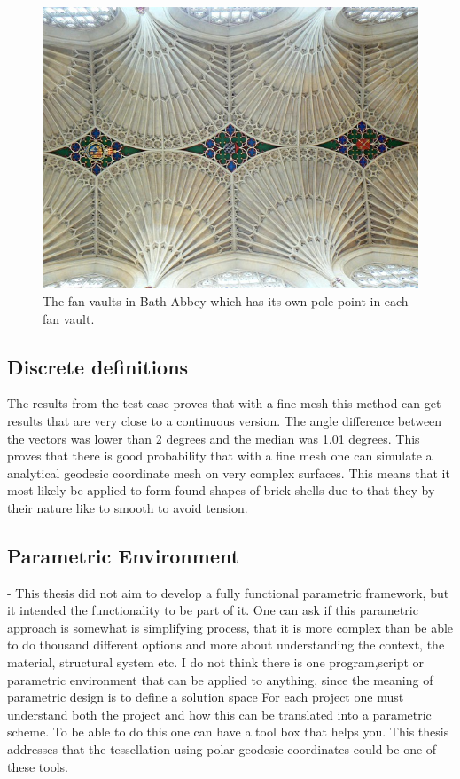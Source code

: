 \begin{figure}[H]
\centering
\includegraphics[width=1.0\linewidth ]{figure/Discussion/bathAbbey.jpg}
\caption{The fan vaults in Bath Abbey which has its own pole point in each fan vault.}
\end{figure}

\subsection{Discrete definitions}

The results from the test case proves that with a fine mesh this method can get results that are very close to a continuous version. The angle difference between the vectors was lower than 2 degrees and the median was 1.01 degrees. This proves that there is good probability that with a fine mesh one can simulate a analytical geodesic coordinate mesh on very complex surfaces. This means that it most likely be applied to form-found shapes of brick shells due to that they by their nature like to smooth to avoid tension.

\subsection{Parametric Environment} - This thesis did not aim to develop a fully functional parametric framework, but it intended the functionality to be part of it. One can ask if this parametric approach is somewhat is simplifying process, that it is more complex than be able to do thousand different options and more about understanding the context, the material, structural system etc. I do not think there is one program,script or parametric environment that can be applied to anything, since the meaning of parametric design is to define a solution space  For each project one must understand both the project and how this can be translated into a parametric scheme. To be able to do this one can have a tool box that helps you. This thesis addresses that the tessellation using polar geodesic coordinates could be one of these tools.

